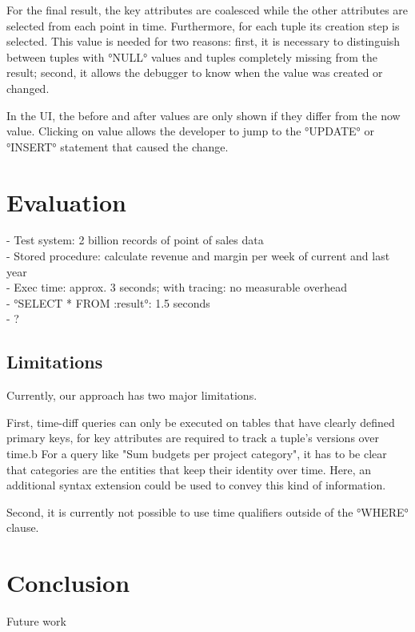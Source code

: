 \documentclass[english]{sig-alternate-05-2015}
\newcommand{\todo}[2][]{\pdfmargincomment[author={#1}]{#2}}
\begin{document}
For the final result, the key attributes are coalesced while the other attributes are selected from each point in time.
Furthermore, for each tuple its creation step is selected.
This value is needed for two reasons: first, it is necessary to distinguish between tuples with °NULL° values and tuples completely missing from the result; second, it allows the debugger to know when the value was created or changed.

In the UI, the before and after values are only shown if they differ from the now value.
Clicking on value allows the developer to jump to the °UPDATE° or °INSERT° statement that caused the change.

\section{Evaluation}
\label{sec:evaluation}

- Test system: 2 billion records of point of sales data \\
- Stored procedure: calculate revenue and margin per week of current and last year \\
- Exec time: approx. 3 seconds; with tracing: no measurable overhead \\
- °SELECT * FROM :result°: 1.5 seconds \\
- \todo{time-diff queries}?


\subsection{Limitations}

Currently, our approach has two major limitations.

First, time-diff queries can only be executed on tables that have clearly defined primary keys, for key attributes are required to track a tuple's versions over time.b
For a query like "Sum budgets per project category", it has to be clear that categories are the entities that keep their identity over time.
Here, an additional syntax extension could be used to convey this kind of information.

Second, it is currently not possible to use time qualifiers outside of the °WHERE° clause.


\section{Conclusion}
\label{sec:conclusion}


Future work

%

\end{document}
